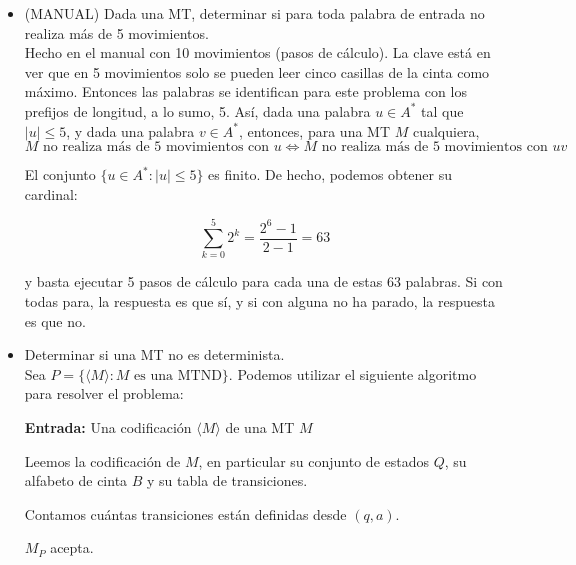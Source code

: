 \begin{ejercicio}
\begin{itemize}
        \item[b)] (MANUAL) Dada una MT, determinar si para toda palabra de entrada no realiza más de 5 movimientos. \\
        
        Hecho en el manual con 10 movimientos (pasos de cálculo). La clave está en ver que en 5 movimientos solo se pueden
        leer cinco casillas de la cinta como máximo. Entonces las palabras se identifican para este problema con los 
        prefijos de longitud, a lo sumo, 5. Así, dada una palabra $u \in A^{*}$ tal que $|u| \leq 5$, y dada 
        una palabra $v \in A^{*}$, entonces, para una MT $M$ cualquiera, 
        $$M \text{ no realiza más de 5 movimientos con $u$} \iff M \text{ no realiza más de 5 movimientos con $uv$}$$

        El conjunto $\{u \in A^{*} : |u| \leq 5\}$ es finito. De hecho, podemos obtener su cardinal:

        $$\sum_{k=0}^{5} 2^k = \dfrac{2^{6} - 1}{2 - 1} = 63$$

        y basta ejecutar 5 pasos de cálculo para cada una de estas 63 palabras. Si con todas para, la respuesta es que sí, 
        y si con alguna no ha parado, la respuesta es que no.

        \item[c)] Determinar si una MT no es determinista. \\
        
        Sea $P = \{\langle M \rangle : M \text{ es una MTND}\}$. Podemos utilizar el siguiente algoritmo para resolver el problema:

        \begin{algorithm}
            \caption{MT $M_{P}$}
            \label{algorithm:no-determinista-decidible}
            \begin{algorithmic}
                \State \textbf{Entrada:} Una codificación $\langle M \rangle$ de una MT $M$

                \State Leemos la codificación de $M$, en particular su conjunto de estados $Q$, su alfabeto de cinta $B$ y su tabla de transiciones.

                    \State Contamos cuántas transiciones están definidas desde $(q,a)$.
                    
                        \State $M_{P}$ acepta.
                    \EndIf
                \EndFor


\end{algorithmic}
\end{algorithm}
\end{itemize}
\end{ejercicio}
